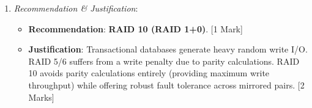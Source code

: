 \begin{solutionbox}
\begin{enumerate}[start=8]
\begin{enumerate}[label=(\alph*)]
        \item \textit{Recommendation \& Justification}:
        \begin{itemize}
            \item \textbf{Recommendation}: \textbf{RAID 10 (RAID 1+0)}. [1 Mark]
            \item \textbf{Justification}: Transactional databases generate heavy random write I/O. RAID 5/6 suffers from a write penalty due to parity calculations. RAID 10 avoids parity calculations entirely (providing maximum write throughput) while offering robust fault tolerance across mirrored pairs. [2 Marks]
        \end{itemize}
    \end{enumerate}
\end{enumerate}
\end{solutionbox}
